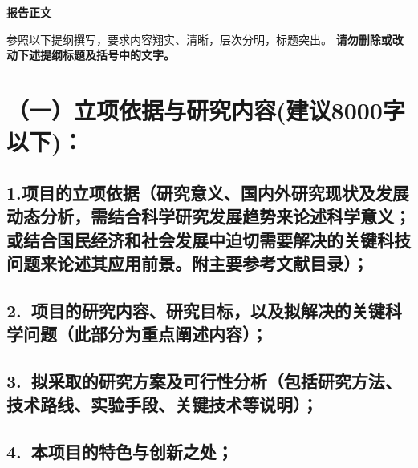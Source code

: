 \documentclass[12pt,UTF8,AutoFakeBold=3,a4paper]{ctexart} %
\newcommand{\sanhao}{\fontsize{16pt}{\baselineskip}\selectfont}
\newcommand{\sihao}{\fontsize{14pt}{\baselineskip}\selectfont}
\begin{document}

\begin{center}
{\sanhao \kaishu \bfseries 报告正文}
\end{center}

{\sihao \kaishu 参照以下提纲撰写，要求内容翔实、清晰，层次分明，标题突出。{\color{MsBlue} \bfseries 请勿删除或改动下述提纲标题及括号中的文字。}}
\vskip -5mm

\section{{\bfseries（一）立项依据与研究内容}({\bfseries 建议8000字以下})：} %

\subsection{\hspace{1.45em} 1.{\bfseries 项目的立项依据}（研究意义、国内外研究现状及发展动态分析，需结合科学研究发展趋势来论述科学意义；或结合国民经济和社会发展中迫切需要解决的关键科技问题来论述其应用前景。附主要参考文献目录）；}

{}

{}


\subsection{\hspace{1.45em} 2.~{\bfseries 项目的研究内容、研究目标，以及拟解决的关键科学问题}（此部分为重点阐述内容）{\bfseries ；}}

{}

\subsection{\hspace{1.45em} 3.~{\bfseries 拟采取的研究方案及可行性分析}（包括研究方法、技术路线、实验手段、关键技术等说明）；}

{}

\subsection{\hspace{1.45em} 4.~{\bfseries 本项目的特色与创新之处；}}
\end{document}
